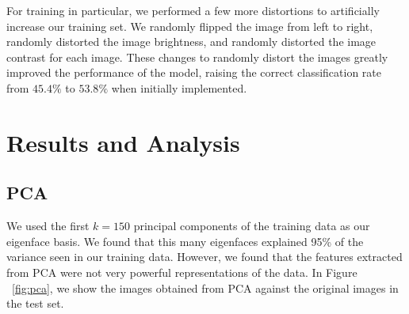 \documentclass[10pt, twocolumn, twoside]{article}
\begin{document}
For training in particular, we performed a few more distortions to artificially increase our training set. We randomly flipped the image from left to right, randomly distorted the image brightness, and randomly distorted the image contrast for each image.
These changes to randomly distort the images greatly improved the performance of the model, raising the correct classification rate from $45.4\%$ to $53.8\%$ when initially implemented.

\section{Results and Analysis}

\subsection{PCA}

We used the first $k = 150$ principal components of the training data as our
eigenface basis. We found that this many eigenfaces explained 95\% of the variance
seen in our training data. However,
we found that the features extracted from PCA were not very powerful representations
of the data. In Figure ~\ref{fig:pca}, we show the images obtained from PCA against
the original images in the test set.
\end{document}
